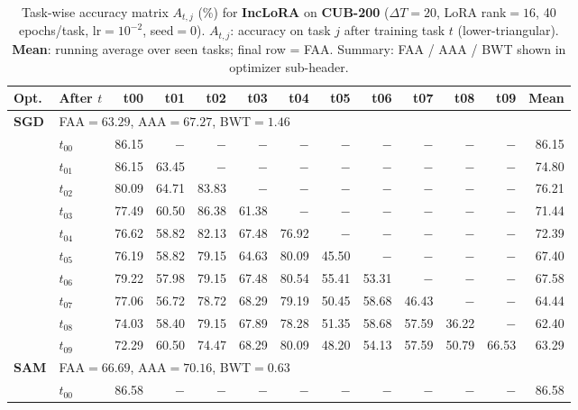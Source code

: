 \begin{table}[ht]
\centering
\caption{%
  Task-wise accuracy matrix $A_{t,j}$ (\%) for \textbf{IncLoRA} on \textbf{CUB-200}
  ($\Delta T=20$, LoRA rank$=16$, 40 epochs/task, lr$=10^{-2}$, seed$=0$).
  $A_{t,j}$: accuracy on task $j$ after training task $t$ (lower-triangular).
  \textbf{Mean}: running average over seen tasks; final row = FAA.
  Summary: FAA / AAA / BWT shown in optimizer sub-header.
}
\label{tab:raw_inclora_cub200}
\setlength{\tabcolsep}{2.8pt}
\renewcommand{\arraystretch}{0.88}
\scriptsize
\begin{tabular}{@{}l l r r r r r r r r r r r@{}}
\toprule
\textbf{Opt.} & \textbf{After $t$} & \textbf{t00} & \textbf{t01} & \textbf{t02} & \textbf{t03} & \textbf{t04} & \textbf{t05} & \textbf{t06} & \textbf{t07} & \textbf{t08} & \textbf{t09} & \textbf{Mean} \\
\midrule
\multirow{11}{*}{\textbf{SGD}} & \multicolumn{12}{l}{\quad\small FAA$=63.29$,\; AAA$=67.27$,\; BWT$=1.46$} \\
 & $t_{00}$ & 86.15 & $-$ & $-$ & $-$ & $-$ & $-$ & $-$ & $-$ & $-$ & $-$ & 86.15 \\
 & $t_{01}$ & 86.15 & 63.45 & $-$ & $-$ & $-$ & $-$ & $-$ & $-$ & $-$ & $-$ & 74.80 \\
 & $t_{02}$ & 80.09 & 64.71 & 83.83 & $-$ & $-$ & $-$ & $-$ & $-$ & $-$ & $-$ & 76.21 \\
 & $t_{03}$ & 77.49 & 60.50 & 86.38 & 61.38 & $-$ & $-$ & $-$ & $-$ & $-$ & $-$ & 71.44 \\
 & $t_{04}$ & 76.62 & 58.82 & 82.13 & 67.48 & 76.92 & $-$ & $-$ & $-$ & $-$ & $-$ & 72.39 \\
 & $t_{05}$ & 76.19 & 58.82 & 79.15 & 64.63 & 80.09 & 45.50 & $-$ & $-$ & $-$ & $-$ & 67.40 \\
 & $t_{06}$ & 79.22 & 57.98 & 79.15 & 67.48 & 80.54 & 55.41 & 53.31 & $-$ & $-$ & $-$ & 67.58 \\
 & $t_{07}$ & 77.06 & 56.72 & 78.72 & 68.29 & 79.19 & 50.45 & 58.68 & 46.43 & $-$ & $-$ & 64.44 \\
 & $t_{08}$ & 74.03 & 58.40 & 79.15 & 67.89 & 78.28 & 51.35 & 58.68 & 57.59 & 36.22 & $-$ & 62.40 \\
 & $t_{09}$ & 72.29 & 60.50 & 74.47 & 68.29 & 80.09 & 48.20 & 54.13 & 57.59 & 50.79 & 66.53 & 63.29 \\
\midrule
\multirow{11}{*}{\textbf{SAM}} & \multicolumn{12}{l}{\quad\small FAA$=66.69$,\; AAA$=70.16$,\; BWT$=0.63$} \\
 & $t_{00}$ & 86.58 & $-$ & $-$ & $-$ & $-$ & $-$ & $-$ & $-$ & $-$ & $-$ & 86.58 \\

\end{tabular}
\end{table}
